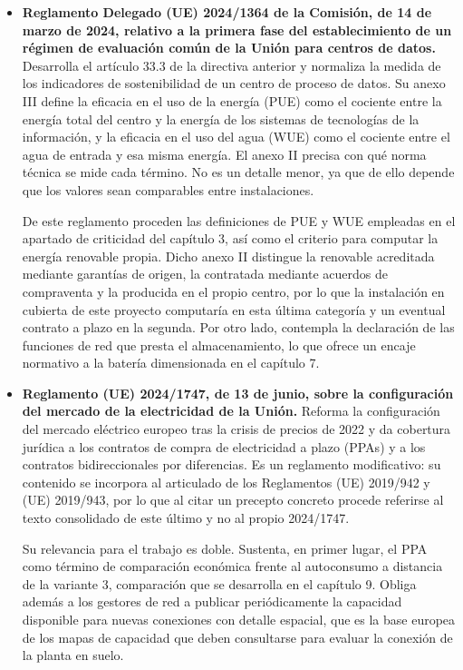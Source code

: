 \begin{itemize}
    \item \textbf{Reglamento Delegado (UE) 2024/1364 de la Comisión, de 14 de marzo de 2024, relativo a la primera fase del establecimiento de un régimen de evaluación común de la Unión para centros de datos.} Desarrolla el artículo 33.3 de la directiva anterior y normaliza la medida de los indicadores de sostenibilidad de un centro de proceso de datos. Su anexo III define la eficacia en el uso de la energía (\ac{PUE}) como el cociente entre la energía total del centro y la energía de los sistemas de tecnologías de la información, y la eficacia en el uso del agua (\ac{WUE}) como el cociente entre el agua de entrada y esa misma energía. El anexo II precisa con qué norma técnica se mide cada término. No es un detalle menor, ya que de ello depende que los valores sean comparables entre instalaciones.

    De este reglamento proceden las definiciones de \ac{PUE} y \ac{WUE} empleadas en el apartado de criticidad del capítulo 3, así como el criterio para computar la energía renovable propia. Dicho anexo II distingue la renovable acreditada mediante garantías de origen, la contratada mediante acuerdos de compraventa y la producida en el propio centro, por lo que la instalación en cubierta de este proyecto computaría en esta última categoría y un eventual contrato a plazo en la segunda. Por otro lado, contempla la declaración de las funciones de red que presta el almacenamiento, lo que ofrece un encaje normativo a la batería dimensionada en el capítulo 7.

    \item \textbf{Reglamento (UE) 2024/1747, de 13 de junio, sobre la configuración del mercado de la electricidad de la Unión.} Reforma la configuración del mercado eléctrico europeo tras la crisis de precios de 2022 y da cobertura jurídica a los contratos de compra de electricidad a plazo (\acp{PPA}) y a los contratos bidireccionales por diferencias. Es un reglamento modificativo: su contenido se incorpora al articulado de los Reglamentos (UE) 2019/942 y (UE) 2019/943, por lo que al citar un precepto concreto procede referirse al texto consolidado de este último y no al propio 2024/1747.

    Su relevancia para el trabajo es doble. Sustenta, en primer lugar, el \ac{PPA} como término de comparación económica frente al autoconsumo a distancia de la variante 3, comparación que se desarrolla en el capítulo 9. Obliga además a los gestores de red a publicar periódicamente la capacidad disponible para nuevas conexiones con detalle espacial, que es la base europea de los mapas de capacidad que deben consultarse para evaluar la conexión de la planta en suelo.
\end{itemize}


